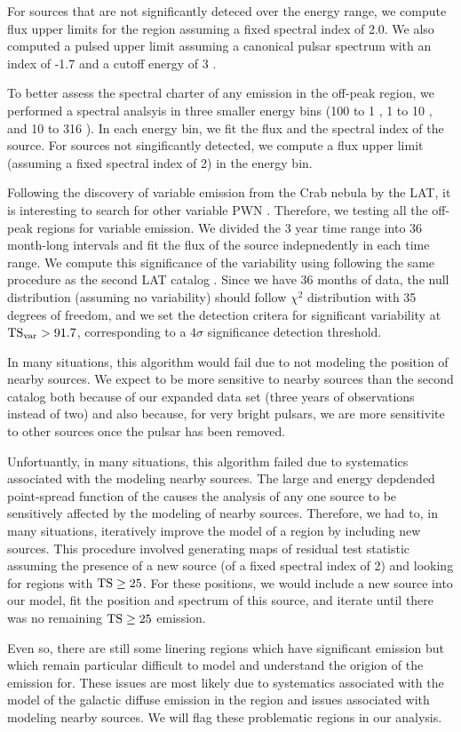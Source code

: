 For sources that are not significantly deteced over the energy range,
we compute flux upper limits for the region assuming a fixed spectral
index of 2.0.  We also computed a pulsed upper limit assuming a canonical
pulsar spectrum with an index of -1.7 and a cutoff energy of 3 \gev.

To better assess the spectral charter of any emission in the off-peak
region, we performed a spectral analsyis in three smaller energy bins
(100 \mev to 1 \gev, 1 \gev to 10 \gev, and 10 \gev to 316 \gev). In each
energy bin, we fit the flux and the spectral index of the source. For
sources not singificantly detected, we compute a flux upper limit
(assuming a fixed spectral index of 2) in the energy bin.


Following the discovery of variable emission from the Crab nebula
by the LAT, it is interesting to search for other variable PWN
\citep{LAT_Collaboration_Crab_Flare_2011}.  Therefore, we testing all the
off-peak regions for variable emission.  We divided the 3 year time range
into 36 month-long intervals and fit the flux of the source indepnedently
in each time range. We compute this significance of the variability
using \tsvar following the same procedure as the second LAT catalog
\citep{LAT_Collaboration_2FGL_2012}.  Since we have 36 months of data,
the null distribution (assuming no variability) should follow $\chi^2$
distribution with 35 degrees of freedom, and we set the detection critera
for significant variability at $\text{TS}_\text{var}>91.7$, corresponding to a $4\sigma$
significance detection threshold.

In many situations, this algorithm would fail due to not modeling the
position of nearby sources. We expect to be more sensitive to nearby
sources than the second \lat catalog both because of our expanded data
set (three years of observations instead of two) and also because, for
very bright pulsars, we are more sensitivite to other sources once the
pulsar has been removed.

Unfortuantly, in many situations, this algorithm failed due to
systematics associated with the modeling nearby sources. The large and
energy depdended point-spread function of the \lat causes the analysis
of any one source to be sensitively affected by the modeling of nearby
sources. Therefore, we had to, in many situations, iteratively improve
the model of a region by including new sources. This procedure involved
generating maps of residual test statistic assuming the presence of a
new source (of a fixed spectral index of 2) and looking for regions with
$\text{TS}\ge25$.  For these positions, we would include a new source into our
model, fit the position and spectrum of this source, and iterate until
there was no remaining $\text{TS}\ge25$ emission.

Even so, there are still some linering regions which have significant
emission but which remain particular difficult to model and understand
the origion of the emission for.  These issues are most likely due to
systematics associated with the model of the galactic diffuse emission
in the region and issues associated with modeling nearby sources. We
will flag these problematic regions in our analysis.

